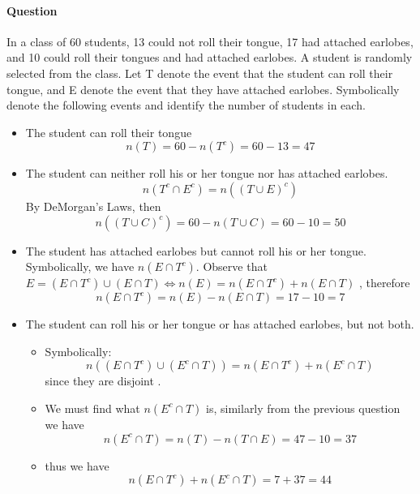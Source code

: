 \documentclass[11pt]{book}
\begin{document}
\paragraph{Question}

In a class of 60 students, 13 could not roll their tongue, 17 had attached
earlobes, and 10 could roll their tongues and had attached earlobes. A
student is randomly selected from the class. Let T denote the event that
the student can roll their tongue, and E denote the event that they have
attached earlobes. Symbolically denote the following events and identify
the number of students in each.

\begin{itemize}
    \item The student can roll their tongue
        \[
        n\left(T\right) = 60 - n\left(T^{c} \right) = 60  - 13 = 47
        \]
    \item The student can neither roll his or her tongue nor has attached earlobes.
        \[
            n\left(T^{c} \cap E^{c} \right) = n\left( \left( T \cup E \right) ^{c}  \right) 
        \]
        By DeMorgan's Laws, then 
        \[
            n\left(\left( T\cup C \right) ^{c} \right) = 60  - n\left(T\cup C\right) = 60  - 10 = 50
        \]
    \item The student has attached earlobes but cannot roll his or her tongue. Symbolically, we have $n\left(E\cap T^{c} \right) $. Observe that $E = \left( E\cap T^{c}  \right) \cup \left( E \cap T \right) \Leftrightarrow n\left(E\right) = n\left(E\cap T^{c} \right)  + n\left(E\cap T\right) $  , therefore 
        \[
        n\left(E\cap T^{c} \right) = n\left(E\right)  - n\left(E\cap T\right) = 17 - 10= 7
        \]
    \item The student can roll his or her tongue or has attached earlobes, but not both.
        \begin{itemize}
            \item Symbolically:
                \[
                    n\left(\left( E\cap T^{c}  \right) \cup \left( E^{c} \cap T \right) \right) = n\left(E\cap T^{c} \right)  + n\left(E^{c} \cap T \right) 
                \]
                since they are disjoint .
            \item We must find what $n\left(E^{c} \cap T\right) $ is, similarly from the previous question we have 
                \[
                n\left(E^{c} \cap T\right) = n\left(T\right)  - n\left(T\cap E\right) = 47  - 10 = 37
                \]
            \item thus we have 
                \[
                n\left(E\cap T^{c} \right)  + n\left(E^{c}  \cap T\right) = 7  + 37= 44
                \]
        \end{itemize}
\end{itemize}
\end{document}
